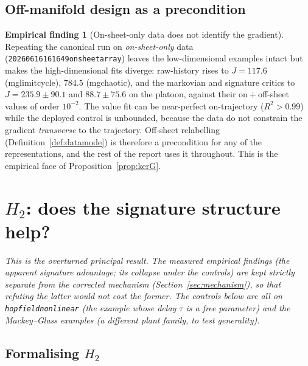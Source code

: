 \documentclass[11pt]{article}
\renewcommand{\_}{\discretionary{\textunderscore}{}{\textunderscore}}
\theoremstyle{plain}
\theoremstyle{definition}
\newtheorem{finding}[theorem]{Empirical finding}
\begin{document}
\subsection{Off-manifold design as a precondition}\label{sec:datamode}

\begin{finding}[On-sheet-only data does not identify the gradient]\label{find:onsheet}
Repeating the canonical run on \emph{on-sheet-only} data
(\texttt{20260616\_161649\_on\_sheet\_array}) leaves the low-dimensional examples intact but makes
the high-dimensional fits diverge: raw-history rises to $J=117.6$ (mg\_limit\_cycle), $784.5$
(mg\_chaotic), and the markovian and signature critics to $J=235.9\pm90.1$ and $88.7\pm75.6$ on
the platoon, against their on${}+{}$off-sheet values of order $10^{-2}$. The value fit can be
near-perfect on-trajectory ($R^{2}>0.99$) while the deployed control is unbounded, because the
data do not constrain the gradient \emph{transverse} to the trajectory. Off-sheet relabelling
(Definition~\ref{def:datamode}) is therefore a precondition for any of the representations, and
the rest of the report uses it throughout. This is the empirical face of
Proposition~\ref{prop:kerG}.
\end{finding}

\section{$H_2$: does the signature structure help?}\label{sec:h2}

\emph{This is the overturned principal result. The measured empirical findings (the apparent
signature advantage; its collapse under the controls) are kept strictly separate from the corrected
mechanism (Section~\ref{sec:mechanism}), so that refuting the latter would not cost the former. The
controls below are all on \texttt{hopfield\_nonlinear} (the example whose delay $\tau$ is a free
parameter) and the Mackey--Glass examples (a different plant family, to test generality).}

\subsection{Formalising \texorpdfstring{$H_2$}{H2}}\label{sec:h2-formal}
\end{document}
